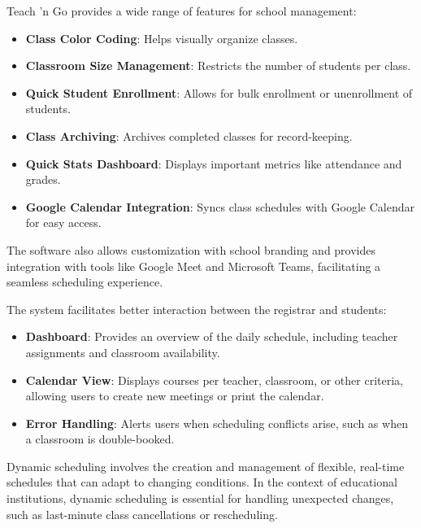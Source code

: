Teach 'n Go provides a wide range of features for school management:
\begin{itemize}
    \item \textbf{Class Color Coding}: Helps visually organize classes.
    \item \textbf{Classroom Size Management}: Restricts the number of students per class.
    \item \textbf{Quick Student Enrollment}: Allows for bulk enrollment or unenrollment of students.
    \item \textbf{Class Archiving}: Archives completed classes for record-keeping.
    \item \textbf{Quick Stats Dashboard}: Displays important metrics like attendance and grades.
    \item \textbf{Google Calendar Integration}: Syncs class schedules with Google Calendar for easy access.
\end{itemize}

The software also allows customization with school branding and provides integration with tools like Google Meet and Microsoft Teams, facilitating a seamless scheduling experience.

The system facilitates better interaction between the registrar and students:
\begin{itemize}
    \item \textbf{Dashboard}: Provides an overview of the daily schedule, including teacher assignments and classroom availability.
    \item \textbf{Calendar View}: Displays courses per teacher, classroom, or other criteria, allowing users to create new meetings or print the calendar.
    \item \textbf{Error Handling}: Alerts users when scheduling conflicts arise, such as when a classroom is double-booked.
\end{itemize}

Dynamic scheduling involves the creation and management of flexible, real-time schedules that can adapt to changing conditions. In the context of educational institutions, dynamic scheduling is essential for handling unexpected changes, such as last-minute class cancellations or rescheduling.

